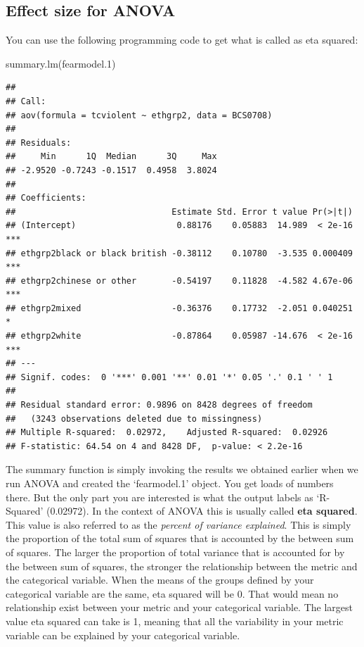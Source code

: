\documentclass[
]{book}
\newenvironment{Shaded}{\begin{snugshade}}{\end{snugshade}}
\newcommand{\FloatTok}[1]{\textcolor[rgb]{0.00,0.00,0.81}{#1}}
\newcommand{\FunctionTok}[1]{\textcolor[rgb]{0.00,0.00,0.00}{#1}}
\newcommand{\NormalTok}[1]{#1}
\begin{document}
\hypertarget{effect-size-for-anova}{%
\subsection{Effect size for ANOVA}\label{effect-size-for-anova}}

You can use the following programming code to get what is called as eta squared:

\begin{Shaded}
\begin{Highlighting}[]
\FunctionTok{summary.lm}\NormalTok{(fearmodel}\FloatTok{.1}\NormalTok{) }
\end{Highlighting}
\end{Shaded}

\begin{verbatim}
## 
## Call:
## aov(formula = tcviolent ~ ethgrp2, data = BCS0708)
## 
## Residuals:
##     Min      1Q  Median      3Q     Max 
## -2.9520 -0.7243 -0.1517  0.4958  3.8024 
## 
## Coefficients:
##                               Estimate Std. Error t value Pr(>|t|)    
## (Intercept)                    0.88176    0.05883  14.989  < 2e-16 ***
## ethgrp2black or black british -0.38112    0.10780  -3.535 0.000409 ***
## ethgrp2chinese or other       -0.54197    0.11828  -4.582 4.67e-06 ***
## ethgrp2mixed                  -0.36376    0.17732  -2.051 0.040251 *  
## ethgrp2white                  -0.87864    0.05987 -14.676  < 2e-16 ***
## ---
## Signif. codes:  0 '***' 0.001 '**' 0.01 '*' 0.05 '.' 0.1 ' ' 1
## 
## Residual standard error: 0.9896 on 8428 degrees of freedom
##   (3243 observations deleted due to missingness)
## Multiple R-squared:  0.02972,    Adjusted R-squared:  0.02926 
## F-statistic: 64.54 on 4 and 8428 DF,  p-value: < 2.2e-16
\end{verbatim}

The summary function is simply invoking the results we obtained earlier when we run ANOVA and created the `fearmodel.1' object. You get loads of numbers there. But the only part you are interested is what the output labels as `R-Squared' (0.02972). In the context of ANOVA this is usually called \textbf{eta squared}. This value is also referred to as the \emph{percent of variance explained}. This is simply the proportion of the total sum of squares that is accounted by the between sum of squares. The larger the proportion of total variance that is accounted for by the between sum of squares, the stronger the relationship between the metric and the categorical variable. When the means of the groups defined by your categorical variable are the same, eta squared will be 0. That would mean no relationship exist between your metric and your categorical variable. The largest value eta squared can take is 1, meaning that all the variability in your metric variable can be explained by your categorical variable.
\end{document}
